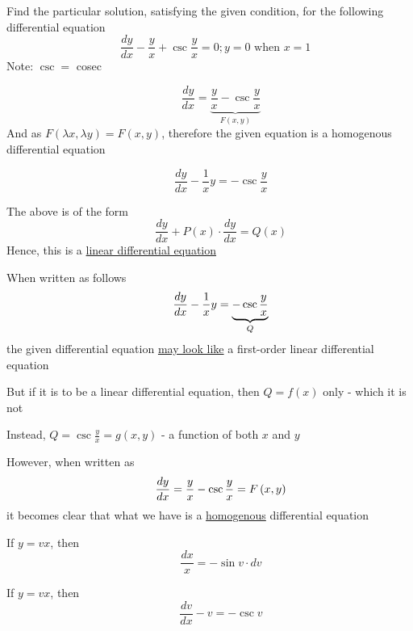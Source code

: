 \documentclass[14pt,fleqn]{extarticle}
\begin{document}
\begin{question}
\statement
	
Find the particular solution, satisfying the 
given condition, for the following differential
equation
\[ \quad\frac{dy}{dx} -\frac{y}{x} + \csc\frac{y}{x} = 0 ; y = 0\text{ when }  x = 1 \] 
Note: $\csc =$ cosec
%
\begin{step}
	\begin{options}
		\correct

\[ \qquad \frac{dy}{dx} = \underbrace{\frac{y}{x} - \csc\frac{y}{x}}_{F(x,y)}\]
And as $F \left(\lambda x,\lambda y \right) = F(x,y)$, therefore the given equation is a homogenous differential equation 

		\incorrect

\[ \qquad \frac{dy}{dx} - \frac{1}{x}y =  - \csc\frac{y}{x} \]

The above is of the form 
\[ \qquad \frac{dy}{dx} + P(x)\cdot\frac{dy}{dx} = Q(x) \]
Hence, this is a \underline{linear differential equation}

	\end{options}
	\reason
	
	When written as follows
	\[ \qquad \frac{dy}{dx} - \frac{1}{x}y = \underbrace{-\csc\frac{y}{x}}_{Q} \]
	the given differential equation \underline{may look like} a 
	first-order linear differential equation\newline 
	
	But if it is to be a linear differential equation, then $Q = f(x)$ only - which it is not \newline 
	
Instead, $Q = \csc\frac{y}{x} = g \left(x,y \right)$ -  a function of both $x$ and $y$ \newline 

However, when written as 
\[ \qquad \frac{dy}{dx} = \frac{y}{x} - \csc\frac{y}{x} = F \left(x,y \right)\]
it becomes clear that what we have is a \underline{homogenous} differential equation
\end{step}
\begin{step}
	\begin{options}
		\correct
		
		If $ y = vx$, then 
		\[\qquad \frac{dx}{x} = -\sin v\cdot dv\]

		\incorrect
		
		If $ y = vx$, then 
		\[\qquad \frac{dv}{dx} - v = -\csc v\]

	\end{options}
	\reason


\end{step}
\end{question}
\end{document}
